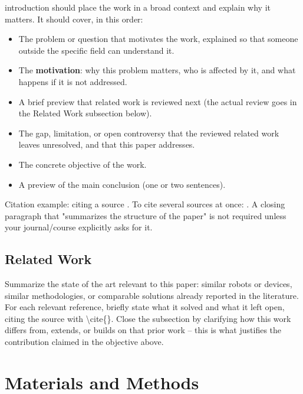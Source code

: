 \documentclass[lettersize,journal]{IEEEtran}
\begin{document}
 introduction should place the work in a broad
context and explain why it matters. It should cover, in this order:
\begin{itemize}
\item The problem or question that motivates the work, explained so
that someone outside the specific field can understand it.
\item The \textbf{motivation}: why this problem matters, who is
affected by it, and what happens if it is not addressed.
\item A brief preview that related work is reviewed next (the actual
review goes in the Related Work subsection below).
\item The gap, limitation, or open controversy that the reviewed
related work leaves unresolved, and that this paper addresses.
\item The concrete objective of the work.
\item A preview of the main conclusion (one or two sentences).
\end{itemize}
Citation example: citing a source \cite{placeholder2026}. To cite
several sources at once: \cite{placeholder2026,placeholder-conf-2026}.
A closing paragraph that "summarizes the structure of the paper" is
not required unless your journal/course explicitly asks for it.

\subsection{Related Work}

Summarize the state of the art relevant to this paper: similar
robots or devices, similar methodologies, or comparable solutions
already reported in the literature. For each relevant reference,
briefly state what it solved and what it left open, citing the source
with \textbackslash cite\{\}. Close the subsection by clarifying how
this work differs from, extends, or builds on that prior work -- this
is what justifies the contribution claimed in the objective above.

\section{Materials and Methods}
\label{sec:methods}
\end{document}
